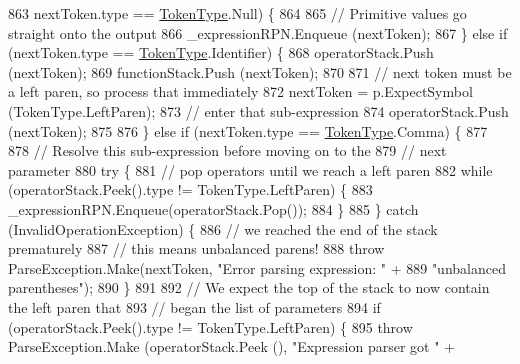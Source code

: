 \begin{DoxyCode}
863                         nextToken.type == \hyperlink{a00031_a301aa7c866593a5b625a8fc158bbeace}{TokenType}.Null) \{
864 
865                         \textcolor{comment}{// Primitive values go straight onto the output}
866                         \_expressionRPN.Enqueue (nextToken);
867                     \} \textcolor{keywordflow}{else} \textcolor{keywordflow}{if} (nextToken.type == \hyperlink{a00031_a301aa7c866593a5b625a8fc158bbeace}{TokenType}.Identifier) \{
868                         operatorStack.Push (nextToken);
869                         functionStack.Push (nextToken);
870 
871                         \textcolor{comment}{// next token must be a left paren, so process that immediately}
872                         nextToken = p.ExpectSymbol (TokenType.LeftParen);
873                         \textcolor{comment}{// enter that sub-expression}
874                         operatorStack.Push (nextToken);
875 
876                     \} \textcolor{keywordflow}{else} \textcolor{keywordflow}{if} (nextToken.type == \hyperlink{a00031_a301aa7c866593a5b625a8fc158bbeace}{TokenType}.Comma) \{
877 
878                         \textcolor{comment}{// Resolve this sub-expression before moving on to the}
879                         \textcolor{comment}{// next parameter}
880                         \textcolor{keywordflow}{try} \{
881                             \textcolor{comment}{// pop operators until we reach a left paren}
882                             \textcolor{keywordflow}{while} (operatorStack.Peek().type != TokenType.LeftParen) \{
883                                 \_expressionRPN.Enqueue(operatorStack.Pop());
884                             \}
885                         \} \textcolor{keywordflow}{catch} (InvalidOperationException) \{
886                             \textcolor{comment}{// we reached the end of the stack prematurely}
887                             \textcolor{comment}{// this means unbalanced parens!}
888                             \textcolor{keywordflow}{throw} ParseException.Make(nextToken, \textcolor{stringliteral}{"Error parsing expression: "} +
889                                 \textcolor{stringliteral}{"unbalanced parentheses"});
890                         \}
891 
892                         \textcolor{comment}{// We expect the top of the stack to now contain the left paren that }
893                         \textcolor{comment}{// began the list of parameters}
894                         \textcolor{keywordflow}{if} (operatorStack.Peek().type != TokenType.LeftParen) \{
895                             \textcolor{keywordflow}{throw} ParseException.Make (operatorStack.Peek (), \textcolor{stringliteral}{"Expression parser got "} +

\end{DoxyCode}

